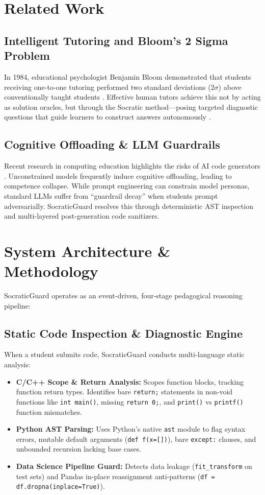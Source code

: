 \documentclass[conference]{IEEEtran}
\begin{document}
\section{Related Work}
\subsection{Intelligent Tutoring and Bloom's 2 Sigma Problem}
In 1984, educational psychologist Benjamin Bloom demonstrated that students receiving one-to-one tutoring performed two standard deviations ($2\sigma$) above conventionally taught students \cite{bloom1984}. Effective human tutors achieve this not by acting as solution oracles, but through the Socratic method---posing targeted diagnostic questions that guide learners to construct answers autonomously \cite{chi2001}.

\subsection{Cognitive Offloading \& LLM Guardrails}
Recent research in computing education highlights the risks of AI code generators \cite{becker2023, prather2023}. Unconstrained models frequently induce cognitive offloading, leading to competence collapse. While prompt engineering can constrain model personas, standard LLMs suffer from ``guardrail decay'' when students prompt adversarially. SocraticGuard resolves this through deterministic AST inspection and multi-layered post-generation code sanitizers.

\section{System Architecture \& Methodology}
SocraticGuard operates as an event-driven, four-stage pedagogical reasoning pipeline:

\subsection{Static Code Inspection \& Diagnostic Engine}
When a student submits code, SocraticGuard conducts multi-language static analysis:
\begin{itemize}
    \item \textbf{C/C++ Scope \& Return Analysis:} Scopes function blocks, tracking function return types. Identifies bare \texttt{return;} statements in non-void functions like \texttt{int main()}, missing \texttt{return 0;}, and \texttt{print()} vs \texttt{printf()} function mismatches.
    \item \textbf{Python AST Parsing:} Uses Python's native \texttt{ast} module to flag syntax errors, mutable default arguments (\texttt{def f(x=[])}), bare \texttt{except:} clauses, and unbounded recursion lacking base cases.
    \item \textbf{Data Science Pipeline Guard:} Detects data leakage (\texttt{fit\_transform} on test sets) and Pandas in-place reassignment anti-patterns (\texttt{df = df.dropna(inplace=True)}).
\end{itemize}
\end{document}
